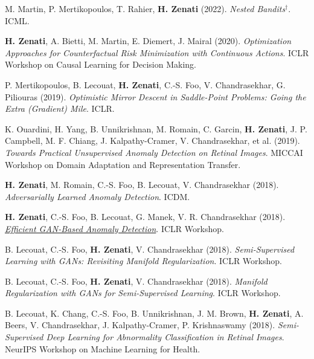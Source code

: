 \documentclass[10pt]{article}
\begin{document}
{\vspace{0.4em}

M. Martin, P. Mertikopoulos, T. Rahier, \textbf{H. Zenati} (2022). \textit{Nested Bandits}$^\dagger$. ICML.

\vspace{0.4em}

\textbf{H. Zenati}, A. Bietti, M. Martin, E. Diemert, J. Mairal (2020). \textit{Optimization Approaches for Counterfactual Risk Minimization with Continuous Actions}. ICLR Workshop on Causal Learning for Decision Making.

\vspace{0.4em}

P. Mertikopoulos, B. Lecouat, \textbf{H. Zenati}, C.-S. Foo, V. Chandrasekhar, G. Piliouras (2019). \textit{Optimistic Mirror Descent in Saddle-Point Problems: Going the Extra (Gradient) Mile}. ICLR.

\vspace{0.4em}

K. Ouardini, H. Yang, B. Unnikrishnan, M. Romain, C. Garcin, \textbf{H. Zenati}, J. P. Campbell, M. F. Chiang, J. Kalpathy-Cramer, V. Chandrasekhar, et al. (2019). \textit{Towards Practical Unsupervised Anomaly Detection on Retinal Images}. MICCAI Workshop on Domain Adaptation and Representation Transfer.

\vspace{0.4em}

\textbf{H. Zenati}, M. Romain, C.-S. Foo, B. Lecouat, V. Chandrasekhar (2018). \textit{Adversarially Learned Anomaly Detection}. ICDM.

\vspace{0.4em}

\textbf{H. Zenati}, C.-S. Foo, B. Lecouat, G. Manek, V. R. Chandrasekhar (2018). \href{https://arxiv.org/abs/1802.06222}{\textit{Efficient GAN-Based Anomaly Detection}}. ICLR Workshop.

\vspace{0.4em}

B. Lecouat, C.-S. Foo, \textbf{H. Zenati}, V. Chandrasekhar (2018). \textit{Semi-Supervised Learning with GANs: Revisiting Manifold Regularization}. ICLR Workshop.

\vspace{0.4em}

B. Lecouat, C.-S. Foo, \textbf{H. Zenati}, V. Chandrasekhar (2018). \textit{Manifold Regularization with GANs for Semi-Supervised Learning}. ICLR Workshop.

\vspace{0.4em}

B. Lecouat, K. Chang, C.-S. Foo, B. Unnikrishnan, J. M. Brown, \textbf{H. Zenati}, A. Beers, V. Chandrasekhar, J. Kalpathy-Cramer, P. Krishnaswamy (2018). \textit{Semi-Supervised Deep Learning for Abnormality Classification in Retinal Images}. NeurIPS Workshop on Machine Learning for Health.
}
\end{document}
